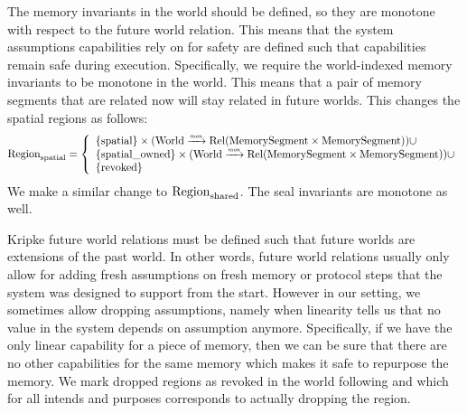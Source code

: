 \begin{jversion}
The memory invariants in the world should be defined, so they are monotone with respect to the future world relation.
This means that the system assumptions capabilities rely on for safety are defined such that capabilities remain safe during execution.
Specifically, we require the world-indexed memory invariants to be monotone in the world.
This means that a pair of memory segments that are related now will stay related in future worlds.
This changes the spatial regions as follows:
\[
  \mathrm{Region}_\mathrm{spatial} = \left\{
  \begin{array}{l}
    \{\mathrm{spatial} \} \times (\mathrm{World} \xrightarrow{\textit{\tiny{mon}}} \mathrm{Rel}(\mathrm{MemorySegment} \times \mathrm{MemorySegment})) \cup \\
    \{\mathrm{spatial\_owned} \} \times (\mathrm{World} \xrightarrow{\textit{\tiny{mon}}} \mathrm{Rel}(\mathrm{MemorySegment} \times \mathrm{MemorySegment})) \cup \\
    \{\mathrm{revoked} \}
  \end{array} \right.
\]
We make a similar change to $\mathrm{Region}_\mathrm{shared}$. The seal invariants are monotone as well.

Kripke future world relations must be defined such that future worlds are extensions of the past world.
In other words, future world relations usually only allow for adding fresh assumptions on fresh memory or protocol steps that the system was designed to support from the start.
However in our setting, we sometimes allow dropping assumptions, namely when linearity tells us that no value in the system depends on assumption anymore.
Specifically, if we have the only linear capability for a piece of memory, then we can be sure that there are no other capabilities for the same memory which makes it safe to repurpose the memory.
We mark dropped regions as revoked in the world following \citet{ahmed_2004} and \citet{thamsborg_2011} which for all intends and purposes corresponds to actually dropping the region. 


\end{jversion}
